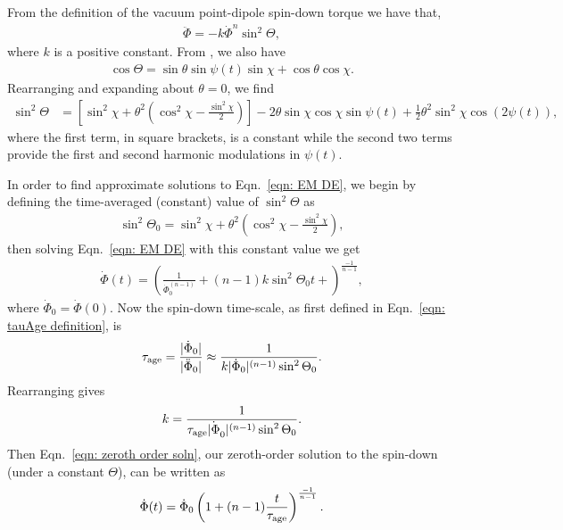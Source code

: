 \documentclass[../full_thesis/full_thesis.tex]{subfiles}
\begin{document}
From the definition of the vacuum point-dipole spin-down torque we have that,
\begin{align}
\ddot{\Phi} = -k \dot{\Phi}^{n} \sin^{2}\Theta,
\label{eqn: EM DE}
\end{align}
where $k$ is a positive constant. From \citet{Jones2001}, we also have
\begin{align}
\cos\Theta = \sin\theta \sin \psi(t) \sin \chi + \cos\theta \cos\chi.
\end{align}
Rearranging and expanding about $\theta = 0$, we find
\begin{align}
\sin^{2}\Theta & =
\left[
\sin^{2}\chi + \theta^{2}\left(\cos^{2}\chi - \frac{\sin^{2}\chi}{2}\right)
\right]
- 2\theta \sin\chi\cos\chi \sin\psi(t)
 + \frac{1}{2}\theta^{2}\sin^{2}\chi\cos(2\psi(t)),
\label{eqn: sin 2 Theta}
\end{align}
where the first term, in square brackets, is a constant while the second two
terms provide the first and second harmonic modulations in $\psi(t)$.

In order to find approximate solutions to Eqn.~\eqref{eqn: EM DE}, we begin by
defining the time-averaged (constant) value of $\sin^{2}\Theta$ as
\begin{align}
\sin^{2}\Theta_0 =
\sin^{2}\chi + \theta^{2}\left(\cos^{2}\chi - \frac{\sin^{2}\chi}{2}\right),
\label{eqn: sin2Theta0}
\end{align}
then solving Eqn.~\eqref{eqn: EM DE} with this constant value we get
\begin{align}
\dot{\Phi}(t) = \left(\frac{1}{\dot{\Phi}_0^{(n-1)}}
                      + (n-1)k\sin^{2}\Theta_0 t + \right)^{\frac{-1}{n-1}},
\label{eqn: zeroth order soln}
\end{align}
where $\dot{\Phi}_0 = \dot{\Phi}(0)$. Now the spin-down time-scale,
as first defined in Eqn.~\eqref{eqn: tauAge definition}, is
\begin{align}
\tau_{\mathrm{age}} = \frac{|\dot{\Phi}_0|}{|\ddot{\Phi}_0|}
\approx \frac{1}{k|\dot{\Phi}_0|^{(n-1)} \sin^{2}\Theta_0}.
\end{align}
Rearranging gives
\begin{align}
k = \frac{1}{\tau_{\mathrm{age}} \dot{|\Phi}_0|^{(n-1)} \sin^{2}\Theta_0}.
\end{align}
Then Eqn.~\eqref{eqn: zeroth order soln}, our zeroth-order solution to the
spin-down (under a constant $\Theta$), can be written as
\begin{align}
\dot{\Phi}(t) = \dot{\Phi}_0\left(1 + (n-1)\frac{t}{\tau_{\mathrm{age}}}\right)^{\frac{-1}{n-1}}.
\label{eqn: zeroth order soln complete}
\end{align}
\end{document}
